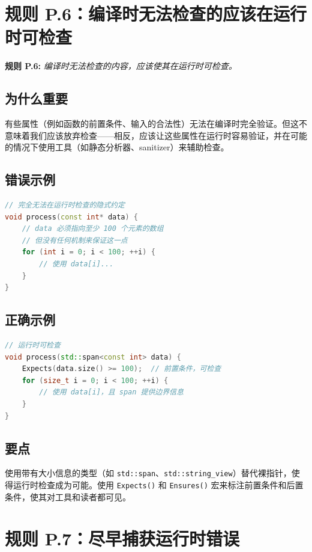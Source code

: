 \section{规则 P.6：编译时无法检查的应该在运行时可检查}

\textbf{规则 P.6:} \textit{编译时无法检查的内容，应该使其在运行时可检查。}

\subsection{为什么重要}

有些属性（例如函数的前置条件、输入的合法性）无法在编译时完全验证。但这不意味着我们应该放弃检查——相反，应该让这些属性在运行时容易验证，并在可能的情况下使用工具（如静态分析器、sanitizer）来辅助检查。

\subsection{错误示例}

\begin{lstlisting}[language=C++]
// 完全无法在运行时检查的隐式约定
void process(const int* data) {
    // data 必须指向至少 100 个元素的数组
    // 但没有任何机制来保证这一点
    for (int i = 0; i < 100; ++i) {
        // 使用 data[i]...
    }
}
\end{lstlisting}

\subsection{正确示例}

\begin{lstlisting}[language=C++]
// 运行时可检查
void process(std::span<const int> data) {
    Expects(data.size() >= 100);  // 前置条件，可检查
    for (size_t i = 0; i < 100; ++i) {
        // 使用 data[i]，且 span 提供边界信息
    }
}
\end{lstlisting}

\subsection{要点}
使用带有大小信息的类型（如 \texttt{std::span}、\texttt{std::string\_view}）替代裸指针，使得运行时检查成为可能。使用 \texttt{Expects()} 和 \texttt{Ensures()} 宏来标注前置条件和后置条件，使其对工具和读者都可见。

\section{规则 P.7：尽早捕获运行时错误}

